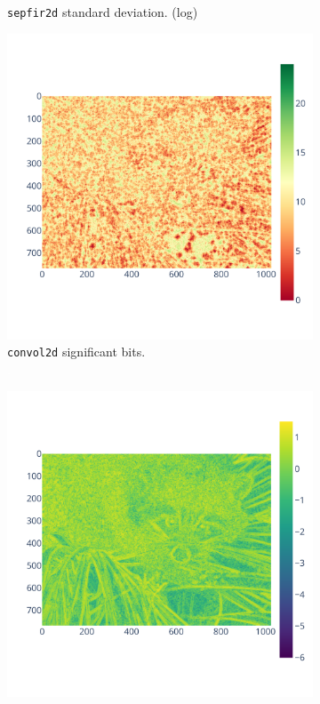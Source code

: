 \documentclass[11pt]{article}
\begin{document}
\begin{figure}
\begin{subfigure}{0.3\linewidth}
    \caption{\centering\texttt{sepfir2d} standard deviation. (log)}
    \label{fig:bspline_bisplev_std}
\end{subfigure}
\begin{subfigure}{0.3\linewidth}
    \includegraphics[width=\linewidth]{figure/bspline/convol2d_sig.pdf}
    \caption{\centering\texttt{convol2d} significant bits. \\ \textcolor{white}{.}}
    \label{fig:bspline_convol2d_sig}
\end{subfigure}
\begin{subfigure}{0.3\linewidth}
    \includegraphics[width=\linewidth]{figure/bspline/convol2d_mean_log.pdf}

\end{subfigure}
\end{figure}
\end{document}
